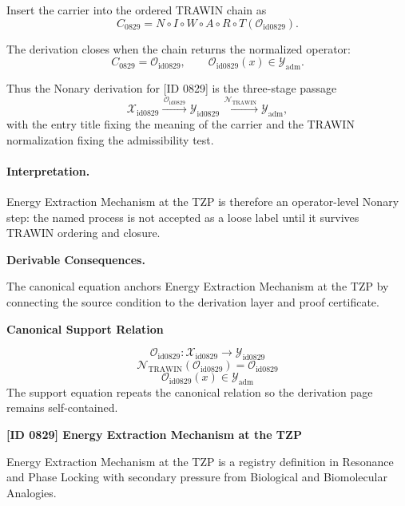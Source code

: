 Insert the carrier into the ordered TRAWIN chain as\[
C_{0829}=N\circ I\circ W\circ A\circ R\circ T(\mathcal{O}_{\mathrm{id0829}}).
\]

The derivation closes when the chain returns the normalized operator:\[
C_{0829}=\mathcal{O}_{\mathrm{id0829}},\qquad \mathcal{O}_{\mathrm{id0829}}(x)\in\mathcal{Y}_{\mathrm{adm}}.
\]

Thus the Nonary derivation for [ID 0829] is the three-stage passage
\[
\mathcal{X}_{\mathrm{id0829}}\xrightarrow{\,\mathcal{O}_{\mathrm{id0829}}\,} \mathcal{Y}_{\mathrm{id0829}}\xrightarrow{\,\mathcal{N}_{\mathrm{TRAWIN}}\,} \mathcal{Y}_{\mathrm{adm}},
\]
with the entry title fixing the meaning of the carrier and the TRAWIN normalization fixing the admissibility test.

\paragraph{Interpretation.} Energy Extraction Mechanism at the TZP is therefore an operator-level Nonary step: the named process is not accepted as a loose label until it survives TRAWIN ordering and closure.

\par\vspace{0.35em}
\noindent\textbf{Derivable Consequences.}\quad
\begingroup
\footnotesize
\raggedright
The canonical equation anchors Energy Extraction Mechanism at the TZP by connecting the source condition to the derivation layer and proof certificate.
\par\endgroup

\noindent\textbf{Canonical Support Relation}\par
\[
\mathcal{O}_{\mathrm{id0829}}:\mathcal{X}_{\mathrm{id0829}}\longrightarrow\mathcal{Y}_{\mathrm{id0829}}
\]
\[
\mathcal{N}_{\mathrm{TRAWIN}}(\mathcal{O}_{\mathrm{id0829}})=\mathcal{O}_{\mathrm{id0829}}
\]
\[
\mathcal{O}_{\mathrm{id0829}}(x)\in\mathcal{Y}_{\mathrm{adm}}
\]
\noindent The support equation repeats the canonical relation so the derivation page remains self-contained.\par

\clearpage
\noindent\textbf{[ID 0829] Energy Extraction Mechanism at the TZP}\par
\vspace{0.35em}
\begingroup\small
{}
Energy Extraction Mechanism at the TZP is a registry definition in Resonance and Phase Locking with secondary pressure from Biological and Biomolecular Analogies.

